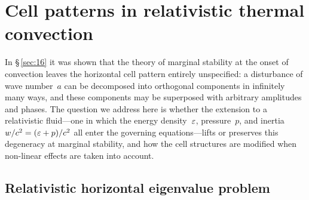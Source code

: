 %

\section{Cell patterns in relativistic thermal convection}\label{sec:rel-16}

In \S\,\ref{sec:16} it was shown that the theory of marginal stability
at the onset of convection leaves the horizontal cell pattern entirely
unspecified: a disturbance of wave number~$a$ can be decomposed into
orthogonal components in infinitely many ways, and these components may
be superposed with arbitrary amplitudes and phases.  The question we
address here is whether the extension to a relativistic fluid---one in
which the energy density~$\varepsilon$, pressure~$p$, and inertia
$w/c^{2}=(\varepsilon+p)/c^{2}$ all enter the governing
equations---lifts or preserves this degeneracy at marginal stability,
and how the cell structures are modified when non-linear effects are
taken into account.

\subsection{Relativistic horizontal eigenvalue problem}\label{sec:rel-16-eigenvalue}

